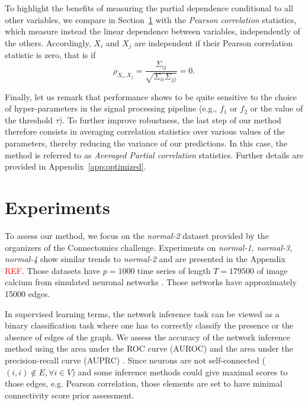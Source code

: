 \documentclass[wcp]{jmlr}
\begin{document}
To highlight the benefits of measuring the partial dependence conditional to
all other variables, we compare in Section~\ref{sec:results} with the
\textit{Pearson correlation} statistics, which measure instead the linear dependence
between variables, independently of the others. Accordingly, $X_i$ and $X_j$ are
independent if their Pearson correlation statistic is zero, that is if
\begin{equation}
\rho_{X_i,X_j} = \frac{\Sigma_{ij}}{\sqrt{\Sigma_{ii} \Sigma_{jj}}} = 0.
\end{equation}

Finally, let us remark that performance shows to be quite sensitive to the choice
of hyper-parameters in the signal processing pipeline (e.g., $f_1$ or $f_2$ or
the value of the threshold $\tau$). To further improve robustness, the last
step of our method therefore consists in averaging correlation statistics over
various values of the parameters, thereby reducing the variance of our
predictions. In this case, the method is referred to as \textit{Averaged Partial correlation} statistics. Further details are provided in Appendix~\ref{app:optimized}.

\section{Experiments} \label{sec:results}

To assess our method, we focus on the \textit{normal-2} dataset
provided by the organizers of the Connectomics challenge. Experiments
on \textit{normal-1, normal-3, normal-4} show similar trends to
\textit{normal-2} and are presented in the Appendix \textcolor{red}{REF}.
Those datasets have $p=1000$ time series of length $T=179500$ of image
calcium from simulated neuronal networks \citep{stetter2012model}. Those
networks have approximately 15000 edges.

In supervised learning terms, the network inference task can be viewed as a
binary classification task where one has to correctly classify the presence
or the absence of edges of the graph. We assess the accuracy of the
network inference method using the area under the ROC curve (AUROC)
and the area under the precision-recall curve (AUPRC)
\citep{schrynemackers2013protocols}. Since neurons are not self-connected
($(i, i) \not \in E, \forall i \in V$) and some inference methods could
give maximal scores to those edges, e.g. Pearson
correlation, those elements are set to have minimal connectivity score prior
assessment.
\end{document}
